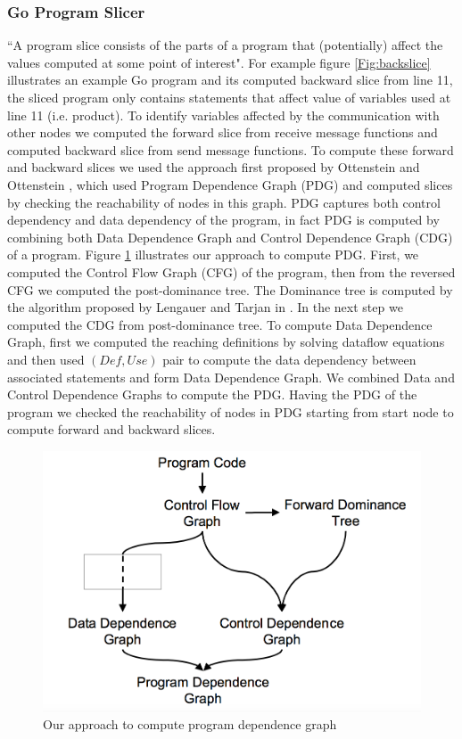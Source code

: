 \subsubsection{Go Program Slicer}

``A program slice consists of the parts of a program that (potentially) affect the values computed at some point of interest"\cite{Tip}. For example figure \ref{Fig:backslice} illustrates an example Go program and its computed backward slice from line 11, the sliced program only contains statements that affect value of variables used at line 11 (i.e. product). To identify variables affected by the communication with other nodes we computed the forward slice from receive message functions and computed backward slice from send message functions. To compute these forward and backward slices we used the approach first proposed by Ottenstein and Ottenstein \cite{PDG}, which used Program Dependence Graph (PDG) and computed slices by checking the reachability of nodes in this graph. PDG captures both control dependency and data dependency of the program, in fact PDG is computed by combining both Data Dependence Graph and Control Dependence Graph (CDG) of a program. Figure \ref{fig:pdg} illustrates our approach to compute PDG. First, we computed the Control Flow Graph (CFG) of the program, then from the reversed CFG we computed the post-dominance tree. The Dominance tree is computed by the algorithm proposed by Lengauer and Tarjan in \cite{Dom}. In the next step we computed the CDG from post-dominance tree. To compute Data Dependence Graph, first we computed the reaching definitions by solving dataflow equations\cite{dragonbook} and then used $(Def,Use)$ pair to compute the data dependency between associated statements and form Data Dependence Graph. We combined Data and Control Dependence Graphs to compute the PDG. Having the PDG of the program we checked the reachability of nodes in PDG starting from start node to compute forward and backward slices.


\begin{figure}
  \includegraphics[width=\columnwidth,scale=0.5]{images/PDG-approach.png}
  \caption{Our approach to compute program dependence graph}
  \label{fig:pdg}
\end{figure}



